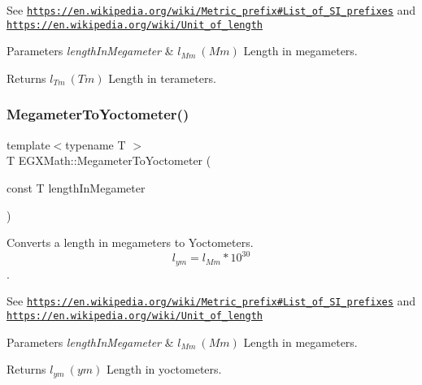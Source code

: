 See \href{https://en.wikipedia.org/wiki/Metric_prefix#List_of_SI_prefixes}{\tt https\+://en.\+wikipedia.\+org/wiki/\+Metric\+\_\+prefix\#\+List\+\_\+of\+\_\+\+S\+I\+\_\+prefixes} and \href{https://en.wikipedia.org/wiki/Unit_of_length}{\tt https\+://en.\+wikipedia.\+org/wiki/\+Unit\+\_\+of\+\_\+length} 
\begin{DoxyParams}{Parameters}
{\em length\+In\+Megameter} & $ l_{Mm}\ (Mm)$ Length in megameters. \\
\hline
\end{DoxyParams}
\begin{DoxyReturn}{Returns}
$ l_{Tm}\ (Tm)$ Length in terameters. 
\end{DoxyReturn}
\mbox{\label{group___e_g_x_math-_conversions-_length_conversions-_megameter-_s_i_gac9b71989abb5a622818f01c5bdbe7285}} 
\subsubsection{\texorpdfstring{Megameter\+To\+Yoctometer()}{MegameterToYoctometer()}}
{\footnotesize\ttfamily template$<$typename T $>$ \\
T E\+G\+X\+Math\+::\+Megameter\+To\+Yoctometer (\begin{DoxyParamCaption}\item[{const T}]{length\+In\+Megameter }\end{DoxyParamCaption})}



Converts a length in megameters to Yoctometers. \[ l_{ym}=l_{Mm} * 10^{30} \]. 

See \href{https://en.wikipedia.org/wiki/Metric_prefix#List_of_SI_prefixes}{\tt https\+://en.\+wikipedia.\+org/wiki/\+Metric\+\_\+prefix\#\+List\+\_\+of\+\_\+\+S\+I\+\_\+prefixes} and \href{https://en.wikipedia.org/wiki/Unit_of_length}{\tt https\+://en.\+wikipedia.\+org/wiki/\+Unit\+\_\+of\+\_\+length} 
\begin{DoxyParams}{Parameters}
{\em length\+In\+Megameter} & $ l_{Mm}\ (Mm)$ Length in megameters. \\
\hline
\end{DoxyParams}
\begin{DoxyReturn}{Returns}
$ l_{ym}\ (ym)$ Length in yoctometers. 
\end{DoxyReturn}
\mbox{\label{group___e_g_x_math-_conversions-_length_conversions-_megameter-_s_i_ga3d729dabc7c37d927c02cf4ae0c560d4}} 
